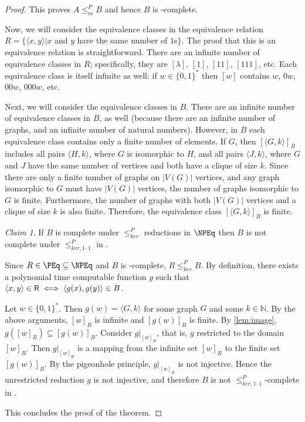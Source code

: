 \documentclass[draft]{article}
\theoremstyle{definition} \newtheorem{openproblem}[openproblem]{Open problem}
\theoremstyle{definition} \newtheorem{definition}[definition]{Definition}
\theoremstyle{remark} \newtheorem{remark}[remark]{Remark}
\newtheorem{claim}{Claim}
\newcommand{\sigmastar}{\{0, 1\}^{*}} %
\newcommand{\kr}{\leq^{P}_{ker}} %
\newcommand{\kri}{\leq^{P}_{ker,1\text{--}1}} %
\newcommand{\mor}{\leq^{P}_{m}} %
\newcommand{\pair}[2]{\langle#1,#2\rangle} %
\begin{document}
\begin{proof}
  This proves $A\mor B$ and hence $B$ is \NP-complete.

  Now, we will consider the equivalence classes in the equivalence relation $R=\{\pair{x}{y}|x$ and $y$ have the same number of $1$s$\}$.
  The proof that this is an equivalence relation is straightforward.
  There are an infinite number of equivalence classes in $R$; specifically, they are $[\lambda]$, $[1]$, $[11]$, $[111]$, etc.
  Each equivalence class is itself infinite as well: if $w\in\sigmastar$ then $[w]$ contains $w$, $0w$, $00w$, $000w$, etc.

  Next, we will consider the equivalence classes in $B$.
  There are an infinite number of equivalence classes in $B$, as well (because there are an infinite number of graphs, and an infinite number of natural numbers).
  However, in $B$ each equivalence class contains only a finite number of elements.
  If $G$, then $[\pair{G}{k}]_B$ includes all pairs $\pair{H}{k}$, where $G$ is isomorphic to $H$, and all pairs $\pair{J}{k}$, where $G$ and $J$ have the same number of vertices and both have a clique of size $k$.
  Since there are only a finite number of graphs on $|V(G)|$ vertices, and any graph isomorphic to $G$ must have $|V(G)|$ vertices, the number of graphs isomorphic to $G$ is finite.
  Furthermore, the number of graphs with both $|V(G)|$ vertices and a clique of size $k$ is also finite.
  Therefore, the equivalence class $[\pair{G}{k}]_B$ is finite.

  \begin{claim}
    If $B$ is complete under $\kr$ reductions in $\NPEq$ then $B$ is not complete under $\kri$ in \NPEq.
  \end{claim}
  Since $R\in\PEq\subseteq\NPEq$ and $B$ is \NPEq-complete, $R\kr B$.
  By definition, there exists a polynomial time computable function $g$ such that $\pair{x}{y}\in\R\iff \pair{g(x)}{g(y)}\in B$.

  Let $w\in\sigmastar$.
  Then $g(w)=\pair{G}{k}$ for some graph $G$ and some $k\in\mathbb{N}$.
  By the above arguments, $[w]_R$ is infinite and $[g(w)]_B$ is finite.
  By \autoref{lem:image}, $g([w]_R)\subseteq [g(w)]_B$.
  Consider $g|_{[w]_R}$, that is, $g$ restricted to the domain $[w]_R$.
  Then $g|_{[w]_R}$ is a mapping from the infinite set $[w]_R$ to the finite set $[g(w)]_B$.
  By the pigeonhole principle, $g|_{[w]_R}$ is not injective.
  Hence the unrestricted reduction $g$ is not injective, and therefore $B$ is not $\kri$-complete in \NPEq.

  This concludes the proof of the theorem.
\end{proof}
\end{document}
